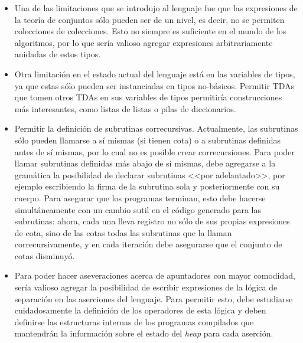 \begin{itemize}
  \item Una de las limitaciones que se introdujo al lenguaje fue que las
  expresiones de la teoría de conjuntos sólo pueden ser de un nivel, es decir,
  no se permiten colecciones de colecciones. Esto no siempre es suficiente en el
  mundo de los algoritmos, por lo que sería valioso agregar expresiones
  arbitrariamente anidadas de estos tipos.

  \item Otra limitación en el estado actual del lenguaje está en las variables
  de tipos, ya que estas sólo pueden ser instanciadas en tipos no-básicos.
  Permitir TDAs que tomen otros TDAs en sus variables de tipos permitiría
  construcciones más interesantes, como listas de listas o pilas de
  diccionarios.

  \item Permitir la definición de subrutinas correcursivas. Actualmente, las
  subrutinas sólo pueden llamarse a sí mismas (si tienen cota) o a subrutinas
  definidas antes de sí mismas, por lo cual no es posible crear correcursiones.
  Para poder llamar subrutinas definidas más abajo de sí mismas, debe agregarse
  a la gramática la posibilidad de declarar subrutinas <<por adelantado>>, por
  ejemplo escribiendo la firma de la subrutina sola y posteriormente con su
  cuerpo. Para asegurar que los programas terminan, esto debe hacerse
  simultáneamente con un cambio sutil en el código generado para las subrutinas:
  ahora, cada una lleva registro no sólo de sus propias expresiones de cota,
  sino de las cotas todas las subrutinas que la llaman correcursivamente, y en
  cada iteración debe asegurarse que el conjunto de cotas disminuyó.

  \item Para poder hacer aseveraciones acerca de apuntadores con mayor
  comodidad, sería valioso agregar la posibilidad de escribir expresiones de la
  lógica de separación en las aserciones del lenguaje. Para permitir esto, debe
  estudiarse cuidadosamente la definición de los operadores de esta lógica y
  deben definirse las estructuras internas de los programas compilados que
  mantendrán la información sobre el estado del \textit{heap} para cada
  aserción.

\end{itemize}
